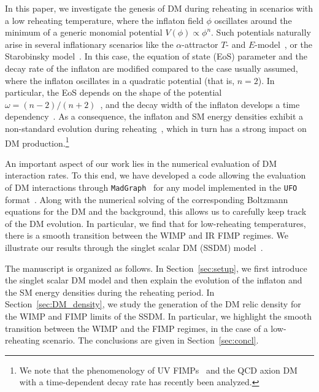 \documentclass[a4paper,11pt]{article}
\begin{document}
In this paper, we investigate the genesis of DM during reheating in scenarios with a low reheating temperature, where the inflaton field $\phi$ oscillates around the minimum of a generic monomial potential $V(\phi) \propto \phi^n$.
Such potentials naturally arise in several inflationary scenarios like the $\alpha$-attractor $T$- and $E$-model~\cite{Kallosh:2013hoa, Kallosh:2013maa, Kallosh:2013yoa}, or the Starobinsky model~\cite{Starobinsky:1980te, Starobinsky:1981vz, Starobinsky:1983zz, Kofman:1985aw}.
In this case, the equation of state (EoS) parameter and the decay rate of the inflaton are modified compared to the case usually assumed, where the inflaton oscillates in a quadratic potential (that is, $n = 2$). In particular, the EoS depends on the shape of the potential $\omega = (n-2)/(n+2)$~\cite{Turner:1983he}, and the decay width of the inflaton develops a time dependency~\cite{Garcia:2020eof, Garcia:2020wiy}. As a consequence, the inflaton and SM energy densities exhibit a non-standard evolution during reheating~\cite{Co:2020xaf}, which in turn has a strong impact on DM production.\footnote{We note that the phenomenology of UV FIMPs~\cite{Garcia:2020eof, Garcia:2020wiy, Ahmed:2021fvt, Barman:2022tzk, Ahmed:2022tfm} and the QCD axion DM~\cite{Arias:2022qjt} with a time-dependent decay rate has recently been analyzed.}

An important aspect of our work lies in the numerical evaluation of DM interaction rates. To this end, we have developed a code allowing the evaluation of DM interactions through \texttt{MadGraph}~\cite{Alwall:2014hca} for any model implemented in the \texttt{UFO} format~\cite{Degrande:2011ua}. Along with the numerical solving of the corresponding Boltzmann equations for the DM and the background, this allows us to carefully keep track of the DM evolution. In particular, we find that for low-reheating temperatures, there is a smooth transition between the WIMP and IR FIMP regimes. We illustrate our results through the singlet scalar DM (SSDM) model~\cite{Silveira:1985rk, McDonald:1993ex, Burgess:2000yq}.

The manuscript is organized as follows. In Section~\ref{sec:setup}, we first introduce the singlet scalar DM model and then explain the evolution of the inflaton and the SM energy densities during the reheating period. In Section~\ref{sec:DM_density}, we study the generation of the DM relic density for the WIMP and FIMP limits of the SSDM. In particular, we highlight the smooth transition between the WIMP and the FIMP regimes, in the case of a low-reheating scenario.
The conclusions are given in Section~\ref{sec:concl}.
\end{document}
